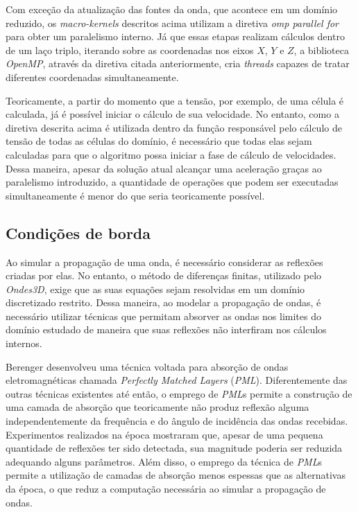 \documentclass[cic,tc]{iiufrgs}
\begin{document}
Com exceção da atualização das fontes da onda, que acontece em um domínio reduzido, os \textit{macro-kernels} descritos acima utilizam a diretiva \textit{omp parallel for}
para obter um paralelismo interno. Já que essas etapas realizam cálculos dentro de um laço triplo, iterando sobre as coordenadas nos eixos $X$, $Y$ e $Z$, a biblioteca \textit{OpenMP},
através da diretiva citada anteriormente, cria \textit{threads} capazes de tratar diferentes coordenadas simultaneamente.

Teoricamente, a partir do momento que a tensão, por exemplo, de uma célula é calculada, já é possível iniciar o cálculo de sua velocidade. No entanto, como a diretiva descrita acima 
é utilizada dentro da função responsável pelo cálculo de tensão de todas as células do domínio, é necessário que todas elas sejam calculadas para que o algoritmo possa iniciar a fase de
cálculo de velocidades. Dessa maneira, apesar da solução atual alcançar uma aceleração graças ao paralelismo introduzido, a quantidade de operações que podem ser executadas simultaneamente
é menor do que seria teoricamente possível. 

\subsection{Condições de borda}

Ao simular a propagação de uma onda, é necessário considerar as reflexões criadas por elas. No entanto, o método de diferenças finitas, utilizado pelo \textit{Ondes3D}, exige que as suas
equações sejam resolvidas em um domínio discretizado restrito. Dessa maneira, ao modelar a propagação de ondas, é necessário utilizar técnicas que permitam absorver as ondas nos limites
do domínio estudado de maneira que suas reflexões não interfiram nos cálculos internos.

Berenger \cite{PML} desenvolveu uma técnica voltada para absorção de ondas eletromagnéticas chamada \textit{Perfectly Matched Layers} (\textit{PML}). Diferentemente
das outras técnicas existentes até então, o emprego de \textit{PML}s permite a construção de uma camada de absorção que teoricamente não produz reflexão alguma independentemente
da frequência e do ângulo de incidência das ondas recebidas. Experimentos realizados na época mostraram que, apesar de uma pequena quantidade de reflexões ter sido detectada,
sua magnitude poderia ser reduzida adequando alguns parâmetros. Além disso, o emprego da técnica de \textit{PML}s permite a utilização de camadas de absorção menos espessas que as
alternativas da época, o que reduz a computação necessária ao simular a propagação de ondas.
\end{document}
